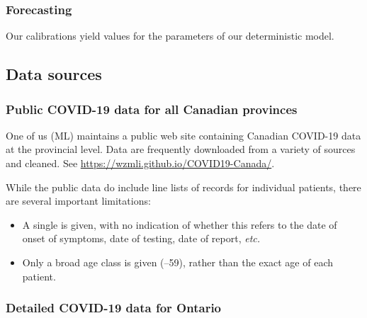 \documentclass[12pt]{article}\usepackage[]{graphicx}\usepackage[]{color}
\begin{document}
\subsubsection*{Forecasting}

Our calibrations yield values for the parameters of our
deterministic model.

\subsection{Data sources}


\subsubsection*{Public COVID-19 data for all Canadian provinces}

One of us (ML) maintains a public web site containing Canadian
COVID-19 data at the provincial level.  Data are frequently downloaded
from a variety of sources and cleaned.  See
\url{https://wzmli.github.io/COVID19-Canada/}.

While the public data do include line lists of records for individual
patients, there are several important limitations: 
\begin{itemize}
\item A single  is given, with no indication of
  whether this refers to the date of onset of symptoms, date of
  testing, date of report, \emph{etc.}
\item Only a broad age class is given (--59), rather than the
  exact age of each patient.
\end{itemize}

\subsubsection*{Detailed COVID-19 data for Ontario}
\end{document}

